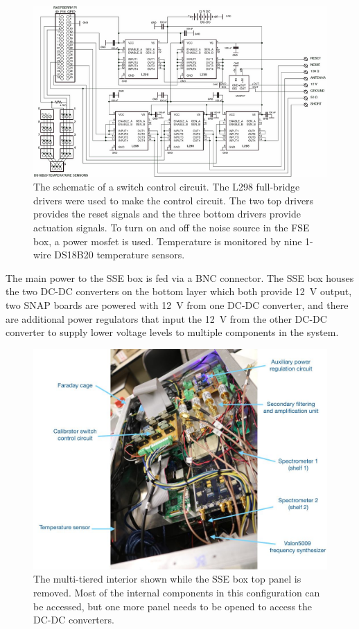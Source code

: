 \begin{figure}
\centering
\includegraphics[width=\linewidth]{Figures/calibrator}
\caption{The schematic of a switch control circuit. The L298 full-bridge drivers were used to make the control circuit. The two top drivers provides the reset signals and the three bottom drivers provide actuation signals. To turn on and off the noise source in the FSE box, a power mosfet is used. Temperature is monitored by nine 1-wire DS18B20 temperature sensors.}
\label{Fig:calibrator}
\end{figure}

The main power to the SSE box is fed via a BNC connector. The SSE box houses the two DC-DC converters on the bottom layer which both provide \SI{12}{\volt} output, two SNAP boards are powered with \SI{12}{\volt} from one DC-DC converter, and there are additional power regulators that input the \SI{12}{\volt} from the other DC-DC converter to supply lower voltage levels to multiple components in the system.

\begin{figure}
	\centering
	\includegraphics[width=0.7\linewidth]{Figures/enclosure_ann}
	\caption{The multi-tiered interior shown while the SSE box top panel is removed. Most of the internal components in this configuration can be accessed, but one more panel needs to be opened to access the DC-DC converters.}
	\label{Fig:enclosure_ann}
\end{figure}

